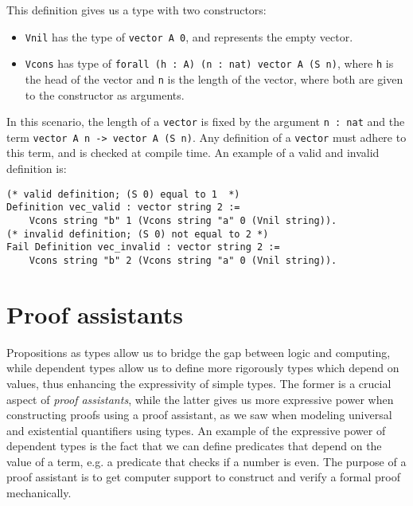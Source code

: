 This definition gives us a type with two constructors:

\begin{itemize}
    \item
        \lstinline{Vnil} has the type of \lstinline{vector A 0}, and represents the empty vector.
    \item
        \lstinline{Vcons} has type of \lstinline{forall (h : A) (n : nat) vector A (S n)}, where \lstinline{h}
                            is the head of the vector and \lstinline{n} is the length of the vector,
                            where both are given to the constructor as arguments.
\end{itemize}

In this scenario, the length of a \lstinline{vector} is fixed by the argument \lstinline{n : nat}
and the term \lstinline{vector A n -> vector A (S n)}.
Any definition of a \lstinline{vector} must adhere to this term, and is checked at compile time.
An example of a valid and invalid definition is:

\begin{minipage}{\linewidth}
\begin{lstlisting}[language=Coq, label={lst:dep_type_vec_ex}, caption={Examples of vectors in Coq}]
(* valid definition; (S 0) equal to 1  *)
Definition vec_valid : vector string 2 :=
    Vcons string "b" 1 (Vcons string "a" 0 (Vnil string)).
(* invalid definition; (S 0) not equal to 2 *)
Fail Definition vec_invalid : vector string 2 :=
    Vcons string "b" 2 (Vcons string "a" 0 (Vnil string)).
\end{lstlisting}
\end{minipage}

\section{Proof assistants}
\label{sec:proof_assistants}

Propositions as types allow us to bridge the gap between logic and computing,
while dependent types allow us to define more rigorously types which depend on values,
thus enhancing the expressivity of simple types.
The former is a crucial aspect of \emph{proof assistants}, while the latter gives
us more expressive power when constructing proofs using a proof assistant,
as we saw when modeling universal and existential quantifiers using types.
An example of the expressive power of dependent types is the fact that we can define
predicates that depend on the value of a term, e.g. a predicate that checks if a number is even.
The purpose of a proof assistant is to get computer support to construct and verify a formal proof mechanically.


